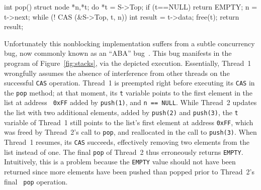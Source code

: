 \begin{figure*}[t]
\begin{minipage}[b]{50mm}
\begin{program}
int pop() {
  struct node *n,*t;
  do {
    *t = S->Top;
    if (t==NULL)
      return EMPTY;
    n = t->next;
  } while (! CAS (&S->Top, t, n))
  int result = t->data;
  free(t);
  return result;
}
    \end{program}
  \end{minipage}
  \begin{minipage}[b]{43mm}
    
  \end{minipage}
  \caption{A lock-based implementation of a concurrent stack and Treiber's
  stack implementation ({\tt EMPTY} is a special value denoting the empty
  stack) together with a client program $P$ and an execution of $P$ when using
  Treiber's stack. The program $P$ consists of two concurrent threads {\tt {\bf
  Thread1}} and {\tt {\bf Thread2}}. In the execution of $P$, a call to ${\tt
  push(\_)}$ is abstracted by a call action ${\tt push(\_)}$ and a return
  action ${\tt ret}$. A method call ${\tt x=pop()}$, where the value returned
  by ${\tt pop}$ is stored in the variable $x$, is abstracted by a call action
  ${\tt pop()}$, a return action ${\tt ret(\_)}$, and an assignment ${\tt
  x=\_}$. The internal actions of the library are abstracted by bolded edges
  since they are not visible to the client.}
  \label{fig:stacks}
\end{figure*}

Unfortunately this nonblocking implementation suffers from a subtle concurrency
bug, now commonly known as an ``ABA'' bug~\cite{tr/ibm/Michael04}. This bug
manifests in the program of Figure~\ref{fig:stacks}, via the depicted
execution. Essentially, Thread~1 wrongfully assumes the absence of interference
from other threads on the successful {\tt CAS} operation. Thread~1 is preempted
right before executing its {\tt CAS} in the {\tt pop} method; at that moment,
its {\tt t} variable points to the first element in the list at address {\tt
0xFF} added by {\tt push(1)}, and {\tt n == NULL}. While Thread~2 updates the
list with two additional elements, added by {\tt push(2)} and {\tt push(3)},
the {\tt t} variable of Thread~1 still points to the list's first element at
address {\tt 0xFF}, which was freed by Thread~2's call to {\tt pop}, and
reallocated in the call to {\tt push(3)}. When Thread~1 resumes, its {\tt CAS}
succeeds, effectively removing two elements from the list instead of one. The
final {\tt pop} of Thread~2 thus erroneously returns {\tt EMPTY}. Intuitively,
this is a problem because the {\tt EMPTY} value should not have been returned
since more elements have been pushed than popped prior to Thread~2's final {\tt
pop} operation.

